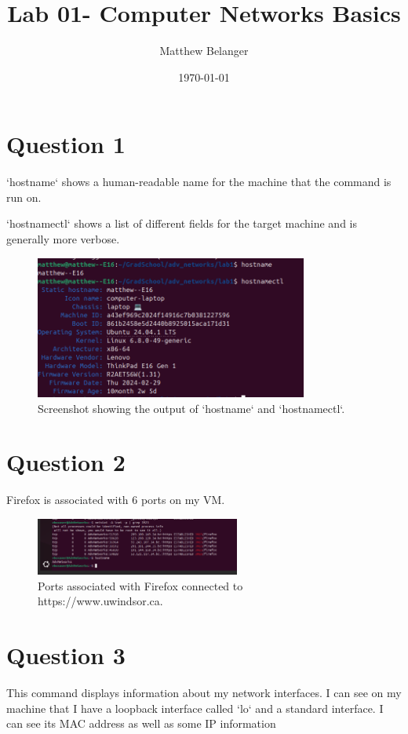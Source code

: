 \documentclass{article}
\title{Lab 01- Computer Networks Basics}
\author{Matthew Belanger}
\date{\today}
\begin{document}
\maketitle

\section{Question 1}
`hostname` shows a human-readable name for the machine that the command is run on.

`hostnamectl` shows a list of different fields for the target machine and is generally more verbose.

\begin{figure}[h]
    \centering
    \includegraphics[width=0.8\textwidth]{./screenshots/hostname.png}
    \caption{Screenshot showing the output of `hostname` and `hostnamectl`.}
    \label{fig:hostname}
\end{figure}

\section{Question 2}
Firefox is associated with 6 ports on my VM.

\begin{figure}[h]
    \centering
    \includegraphics[width=0.6\textwidth]{./screenshots/firefox.png}
    \caption{Ports associated with Firefox connected to https://www.uwindsor.ca.}
    \label{fig:firefox}
\end{figure}

\section{Question 3}
This command displays information about my network interfaces. I can see on my machine that I have a loopback interface called `lo` and a standard interface. I can see its MAC address as well as some IP information
\end{document}
